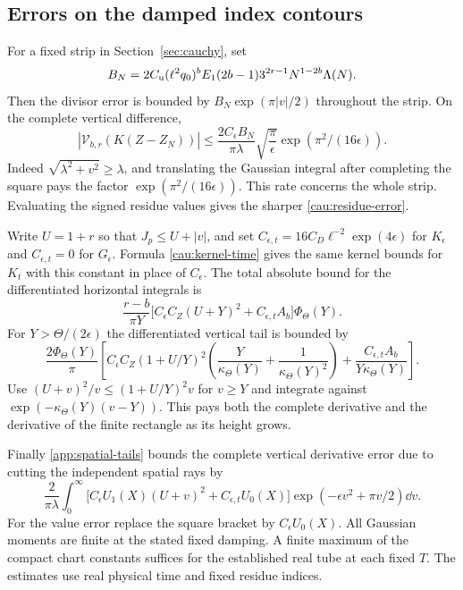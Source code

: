 \subsection{Errors on the damped index contours}\label{app:cauchy-errors}

For a fixed strip in Section~\ref{sec:cauchy}, set
\[
 B_N=2C_{\mathrm u}(\ell^2q_0)^b E_1(2b-1)3^{2r-1}
                                           N^{1-2b}\Lambda(N).
\]
Then the divisor error is bounded by \(B_N\exp(\pi|v|/2)\)
throughout the strip. On the complete vertical difference,
\begin{equation}
 |\mathcal V_{b,r}(K(Z-Z_N))|\le
   \frac{2 C_\epsilon B_N}{\pi\lambda}
                   \sqrt{\frac{\pi}{\epsilon}}\exp(\pi^2/(16\epsilon)).
 \label{app:weighted-divisor-tail}
\end{equation}
Indeed \(\sqrt{\lambda^2+v^2}\ge\lambda\), and translating the
Gaussian integral after completing the square pays the factor
\(\exp(\pi^2/(16\epsilon))\).
This rate concerns the whole strip. Evaluating the signed residue
values gives the sharper \eqref{cau:residue-error}.

Write \(U=1+r\) so that \(J_p\le U+|v|\), and set
\(C_{\epsilon,t}=16C_D\ell^{-2}\exp(4\epsilon)\) for \(K_\epsilon\)
and \(C_{\epsilon,t}=0\) for \(G_\epsilon\). Formula
\eqref{cau:kernel-time} gives the same kernel bounds for \(K_t\)
with this constant in place of \(C_\epsilon\). The total absolute
bound for the differentiated horizontal integrals is
\[
 \frac{r-b}{\pi Y}\big[C_\epsilon C_Z(U+Y)^2+
                         C_{\epsilon,t}A_b\big]\Phi_\Theta(Y).
\]
For \(Y>\Theta/(2\epsilon)\) the differentiated vertical tail is
bounded by
\[
 \frac{2\Phi_\Theta(Y)}{\pi}\left[
 C_\epsilon C_Z(1+U/Y)^2
     \left(\frac{Y}{\kappa_\Theta(Y)}+\frac{1}{\kappa_\Theta(Y)^2}\right)
 +\frac{C_{\epsilon,t}A_b}{Y\kappa_\Theta(Y)}
 \right].
\]
Use \((U+v)^2/v\le(1+U/Y)^2v\) for \(v\ge Y\) and integrate
against \(\exp(-\kappa_\Theta(Y)(v-Y))\). This pays both the
complete derivative and the derivative of the finite rectangle
as its height grows.

Finally \eqref{app:spatial-tails} bounds the complete vertical
derivative error due to cutting the independent spatial rays by
\begin{equation}
 \frac{2}{\pi\lambda}\int_0^\infty
 \big[C_\epsilon U_1(X)(U+v)^2+C_{\epsilon,t}U_0(X)\big]
               \exp(-\epsilon v^2+\pi v/2)\dd v .
 \label{app:weighted-spatial-tail}
\end{equation}
For the value error replace the square bracket by
\(C_\epsilon U_0(X)\). All Gaussian moments are finite at the
stated fixed damping. A finite maximum of the compact chart
constants suffices for the established real tube at each fixed \(T\).
The estimates use real physical time and fixed residue indices.

